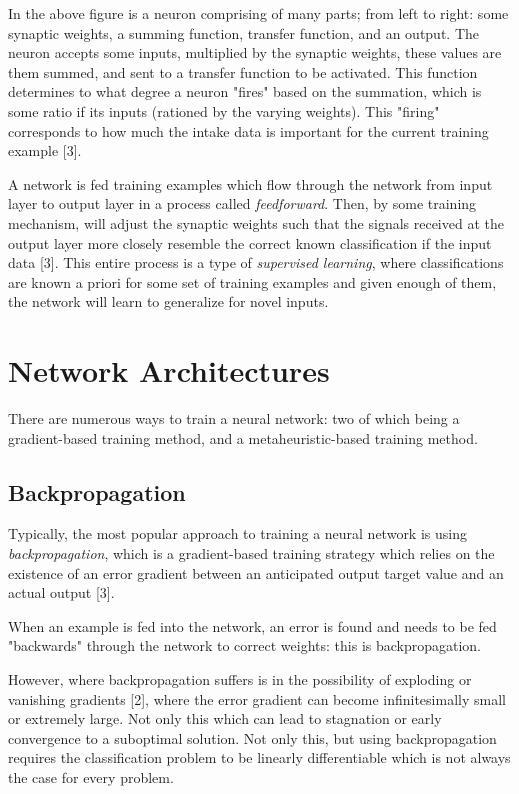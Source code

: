 \documentclass[a4paper,12pt]{article}
\begin{document}
In the above figure is a neuron comprising of many parts; from left to right: some synaptic weights, a summing function, transfer function, and an output. The neuron accepts some inputs, multiplied by the synaptic weights, these values are them summed, and sent to a transfer function to be activated. This function determines to what degree a neuron "fires" based on the summation, which is some ratio if its inputs (rationed by the varying weights). This "firing" corresponds to how much the intake data is important for the current training example [3].

A network is fed training examples which flow through the network from input layer to output layer in a process called \textit{feedforward}. Then, by some training mechanism, will adjust the synaptic weights such that the signals received at the output layer more closely resemble the correct known classification if the input data [3]. This entire process is a type of \textit{supervised learning}, where classifications are known a priori for some set of training examples and given enough of them, the network will learn to generalize for novel inputs.

\pagebreak

\section{Network Architectures}

There are numerous ways to train a neural network: two of which being a gradient-based training method, and a metaheuristic-based training method.

\subsection{Backpropagation}

Typically, the most popular approach to training a neural network is using \textit{backpropagation}, which is a gradient-based training strategy which relies on the existence of an error gradient between an anticipated output target value and an actual output [3].

When an example is fed into the network, an error is found and needs to be fed "backwards" through the network to correct weights: this is backpropagation.

However, where backpropagation suffers is in the possibility of exploding or vanishing gradients [2], where the error gradient can become infinitesimally small or extremely large. Not only this which can lead to stagnation or early convergence to a suboptimal solution. Not only this, but using backpropagation requires the classification problem to be linearly differentiable which is not always the case for every problem.
\end{document}
